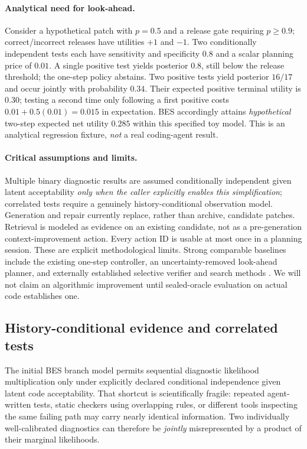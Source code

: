 \documentclass[pdflatex,sn-basic]{sn-jnl}
\begin{document}
\paragraph{Analytical need for look-ahead.}
Consider a hypothetical patch with $p=0.5$ and a release
gate requiring $p\ge0.9$; correct/incorrect releases have
utilities $+1$ and $-1$. Two conditionally independent
tests each have sensitivity and specificity $0.8$
and a scalar planning price of $0.01$. A single positive
test yields posterior $0.8$, still below the release
threshold; the one-step policy abstains. Two positive
tests yield posterior $16/17$ and occur jointly with
probability $0.34$. Their expected positive terminal
utility is $0.30$; testing a second time only following
a first positive costs $0.01+0.5(0.01)=0.015$ in
expectation. BES accordingly attains \emph{hypothetical}
two-step expected net utility $0.285$ within this
specified toy model. This is an analytical regression
fixture, \emph{not} a real coding-agent result.

\paragraph{Critical assumptions and limits.}
Multiple binary diagnostic results are assumed
conditionally independent given latent acceptability
\emph{only when the caller explicitly enables this
simplification}; correlated tests require a genuinely
history-conditional observation model. Generation and
repair currently replace, rather than archive, candidate
patches. Retrieval is modeled as evidence on an existing
candidate, not as a pre-generation context-improvement
action. Every action ID is usable at most once in a
planning session. These are explicit methodological
limits. Strong comparable baselines include the existing
one-step controller, an uncertainty-removed look-ahead
planner, and externally established selective verifier
and search methods \cite{antoniades2025swesearch,zou2026sweverifier}.
We will not claim an algorithmic improvement until
sealed-oracle evaluation on actual code establishes one.

\subsection{History-conditional evidence and correlated tests}
\label{sec:conditional}

The initial BES branch model permits sequential diagnostic
likelihood multiplication only under explicitly declared
conditional independence given latent code acceptability.
That shortcut is scientifically fragile: repeated agent-written
tests, static checkers using overlapping rules, or different
tools inspecting the same failing path may carry nearly
identical information. Two individually well-calibrated
diagnostics can therefore be \emph{jointly} misrepresented by
a product of their marginal likelihoods.
\end{document}
